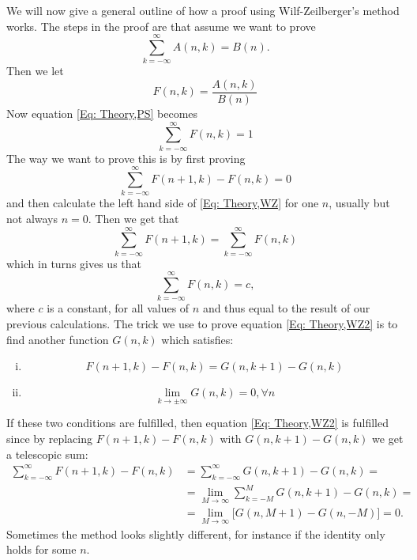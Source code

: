 We will now give a general outline of how a proof using Wilf-Zeilberger's method works. The steps in the proof are that assume we want to prove
\begin{equation}\label{Eq: Theory,PS}
  \sum_{k=-\infty}^\infty A(n,k) = B(n).
\end{equation}
Then we let
\begin{equation}
  F(n,k)=\frac{A(n,k)}{B(n)}
\end{equation}
Now equation \eqref{Eq: Theory,PS} becomes
\begin{equation}\label{Eq: Theory,WZ}
  \sum_{k=-\infty}^\infty F(n,k) = 1
\end{equation}
The way we want to prove this is by first proving
\begin{equation}\label{Eq: Theory,WZ2}
  \sum_{k=-\infty}^\infty F(n+1,k)-F(n,k) = 0
\end{equation}
and then calculate the left hand side of \eqref{Eq: Theory,WZ} for one $n$, usually but not always $n=0$. Then we get that
\begin{equation}
  \sum_{k=-\infty}^\infty F(n+1,k)=\sum_{k=-\infty}^\infty F(n,k)
\end{equation}
which in turns gives us that
\begin{equation}
  \sum_{k=-\infty}^\infty F(n,k) = c,
\end{equation}
where $c$ is a constant, for all values of $n$ and thus equal to the result of our previous calculations. The trick we use to prove equation \eqref{Eq: Theory,WZ2} is to find another function $G(n,k)$ which satisfies:
\begin{enumerate}[i)]
  \item
  \begin{equation}\label{Eq: Theory,first condition}
    F(n+1,k)-F(n,k)=G(n,k+1)-G(n,k)
  \end{equation}
  \item
  \begin{equation}\label{Eq: Theory,second condition}
    \lim_{k\to\pm\infty}G(n,k)=0, \forall n
  \end{equation}
\end{enumerate}
If these two conditions are fulfilled, then equation \eqref{Eq: Theory,WZ2} is fulfilled since by replacing $F(n+1,k)-F(n,k)$ with $G(n,k+1)-G(n,k)$ we get a telescopic sum:
\begin{equation*}
\begin{split}
\sum_{k=-\infty}^\infty F(n+1,k)-F(n,k) & = \sum_{k=-\infty}^\infty G(n,k+1)-G(n,k) = \\
 & = \lim_{M\to\infty} \sum_{k=-M}^M G(n,k+1)-G(n,k) = \\
 & = \lim_{M\to\infty} \big[G(n,M+1)-G(n,-M)\big] = 0.
\end{split}
\end{equation*}
Sometimes the method looks slightly different, for instance if the identity only holds for some $n$.

